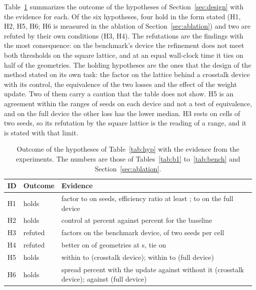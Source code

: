 Table~\ref{tab:outcome} summarizes the outcome of the hypotheses of Section~\ref{sec:design} with the evidence for each. Of the six hypotheses, four hold in the form stated (H1, H2, H5, H6; H6 is measured in the ablation of Section~\ref{sec:ablation}) and two are refuted by their own conditions (H3, H4). The refutations are the findings with the most consequence: on the benchmark's device the refinement does not meet both thresholds on the square lattice, and at an equal wall-clock time it ties on half of the geometries. The holding hypotheses are the ones that the design of the method stated on its own task: the factor on the lattice behind a crosstalk device with its control, the equivalence of the two losses and the effect of the weight update. Two of them carry a caution that the table does not show. H5 is an agreement within the ranges of \schroffXN{} seeds on each device and not a test of equivalence, and on the full device the other loss has the lower median. H3 rests on cells of two seeds, so its refutation by the square lattice is the reading of a range, and it is stated with that limit.

\begin{table}[t]
\centering\small
\caption{Outcome of the hypotheses of Table~\ref{tab:hyp} with the evidence from the experiments. The numbers are those of Tables~\ref{tab:b1} to~\ref{tab:bench} and Section~\ref{sec:ablation}.}
\label{tab:outcome}
\begin{tabular}{@{}l l p{9.2cm}@{}}
\toprule
ID & Outcome & Evidence\\
\midrule
H1 & holds & factor \ratioOneMin{} to \ratioOneMax{} on \nSeedsOne{} seeds, efficiency ratio at least \effRatioOneMin{}; \ratioOneFullMin{} to \ratioOneFullMax{} on the full device\\
H2 & holds & control at \sigmaNoModel{} percent against \sigmaMsevenThirty{} percent for the baseline\\
H3 & refuted & factors \benchOneDevList{} on the benchmark device, of two seeds per cell\\
H4 & refuted & better on \benchOneDevTimeProposed{} of \benchOneDevCells{} geometries at \benchOneTimeBudget{} s, tie on \benchOneDevTimeTie{}\\
H5 & holds & \ablBFullSig{} within \schroffXSigMin{} to \schroffXSigMax{} (crosstalk device); \ablBFFullSig{} within \schroffFSigMin{} to \schroffFSigMax{} (full device)\\
H6 & holds & spread \ablBWeightsSig{} percent with the update against \ablBFullSig{} without it (crosstalk device); \ablBFWeightsSig{} against \ablBFFullSig{} (full device)\\
\bottomrule
\end{tabular}
\end{table}
